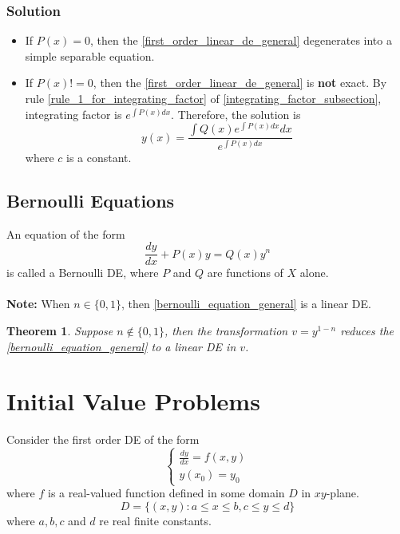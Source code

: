 \documentclass[oneside]{book}
\newtheorem{theorem}{Theorem}[chapter]
\begin{document}
\subsubsection{Solution}
\begin{itemize}
	\item If $P(x) = 0$, then the \cref{first_order_linear_de_general} degenerates into a simple separable equation.
	\item If $P(x) != 0$, then the \cref{first_order_linear_de_general} is \textbf{not} exact. By rule \ref{rule_1_for_integrating_factor} of \cref{integrating_factor_subsection}, integrating factor is \(\displaystyle e^{\int P(x)dx}\). Therefore, the solution is
	      \[
		      y(x) = \frac{\int Q(x)e^{\int P(x)dx}dx}{e^{\int P(x)dx}}
	      \]
	      where $c$ is a constant.
\end{itemize}

\subsection{Bernoulli Equations}
An equation of the form
\begin{equation}
	\frac{dy}{dx} + P(x) y  = Q(x) y^n
	\label{bernoulli_equation_general}
\end{equation}
is called a Bernoulli DE, where $P$ and $Q$ are functions of $X$ alone.
\\\\
\noindent\textbf{Note:} When $n\in\{0, 1\}$, then \cref{bernoulli_equation_general} is a linear DE.

\begin{theorem}
	Suppose \(n\notin\{0, 1\}\), then the transformation \(v = y^{1-n}\) reduces the \cref{bernoulli_equation_general} to a linear DE in \(v\).
\end{theorem}

\section{Initial Value Problems}
Consider the first order DE of the form
\[
	\begin{cases}
		\frac{dy}{dx} = f(x, y) \\
		y(x_0) = y_0
	\end{cases}
\]
where \(f\) is a real-valued function defined in some domain \(D\) in \(xy\)-plane.
\[
	D = \{(x, y): a\leq x \leq b, c\leq y \leq d\}
\]
where \(a, b, c\) and \(d\) re real finite constants.\\
\end{document}
